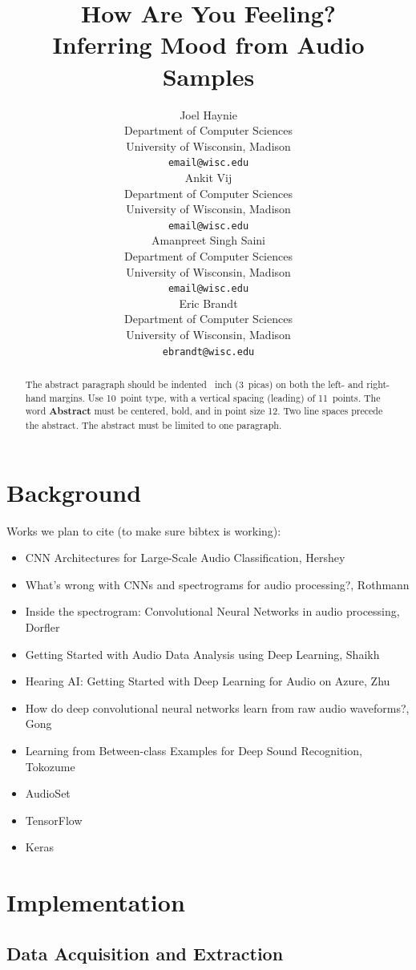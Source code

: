 \documentclass{article}
\title{How Are You Feeling? \\ Inferring Mood from Audio Samples}
\author{
  Joel Haynie \\
  Department of Computer Sciences\\
  University of Wisconsin, Madison\\
  \texttt{email@wisc.edu} \\
  \And
  Ankit Vij \\
  Department of Computer Sciences\\
  University of Wisconsin, Madison\\
  \texttt{email@wisc.edu} \\
  \AND
  Amanpreet Singh Saini \\
  Department of Computer Sciences\\
  University of Wisconsin, Madison\\
  \texttt{email@wisc.edu} \\
  \And
  Eric Brandt \\
  Department of Computer Sciences\\
  University of Wisconsin, Madison\\
  \texttt{ebrandt@wisc.edu}
}
\begin{document}

\maketitle

\begin{abstract}
  The abstract paragraph should be indented ~inch
  (3~picas) on both the left- and right-hand margins. Use 10~point
  type, with a vertical spacing (leading) of 11~points.  The word
  \textbf{Abstract} must be centered, bold, and in point size 12. Two
  line spaces precede the abstract. The abstract must be limited to
  one paragraph.
\end{abstract}

\section{Background}

Works we plan to cite (to make sure bibtex is working): 
\begin{itemize}
\item CNN Architectures for Large-Scale Audio Classification, Hershey\cite{hershey}
\item What’s wrong with CNNs and spectrograms for audio processing?, Rothmann\cite{rothmann}
\item Inside the spectrogram: Convolutional Neural Networks in audio processing, Dorfler\cite{dorfler}
\item Getting Started with Audio Data Analysis using Deep Learning, Shaikh\cite{shaikh}
\item Hearing AI: Getting Started with Deep Learning for Audio on Azure, Zhu\cite{zhu}
\item How do deep convolutional neural networks learn from raw audio waveforms?, Gong\cite{gong}
\item Learning from Between-class Examples for Deep Sound Recognition, Tokozume \cite{tokozume}
\item AudioSet \cite{audioset}
\item TensorFlow \cite{tensorflow}
\item Keras \cite{keras}
\end{itemize}
	
\section{Implementation}

\subsection{Data Acquisition and Extraction}
\end{document}

